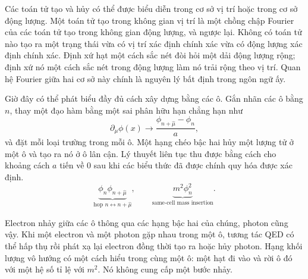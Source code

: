 Các toán tử tạo và hủy có thể được biểu diễn trong cơ sở vị trí hoặc trong cơ sở động lượng. Một toán tử tạo trong không gian vị trí là một chồng chập Fourier của các toán tử tạo trong không gian động lượng, và ngược lại. Không có toán tử nào tạo ra một trạng thái vừa có vị trí xác định chính xác vừa có động lượng xác định chính xác. Định xứ hạt một cách sắc nét đòi hỏi một dải động lượng rộng; định xứ nó một cách sắc nét trong động lượng làm nó trải rộng theo vị trí. Quan hệ Fourier giữa hai cơ sở này chính là nguyên lý bất định trong ngôn ngữ ấy.

\begin{classroomqa}
\end{classroomqa}

Giờ đây có thể phát biểu đầy đủ cách xây dựng bằng các ô. Gắn nhãn các ô bằng \(n\), thay một đạo hàm bằng một sai phân hữu hạn chẳng hạn như
\begin{equation}
\partial_\mu\phi(x)
\longrightarrow
\frac{\phi_{n+\hat\mu}-\phi_n}{a},
\end{equation}
và đặt mỗi loại trường trong mỗi ô. Một hạng chéo bậc hai hủy một lượng tử ở một ô và tạo ra nó ở ô lân cận. Lý thuyết liên tục thu được bằng cách cho khoảng cách \(a\) tiến về 0 sau khi các biểu thức đã được chính quy hóa được xác định.
\begin{equation}
\underbrace{\phi_n\phi_{n+\hat\mu}}_{\text{hop }n\leftrightarrow n+\hat\mu},
\qquad
\underbrace{m^2\phi_n^2}_{\text{same-cell mass insertion}}.
\end{equation}

\begin{classroomqa}
\end{classroomqa}

Electron nhảy giữa các ô thông qua các hạng bậc hai của chúng, photon cũng vậy. Khi một electron và một photon gặp nhau trong một ô, tương tác QED có thể hấp thụ rồi phát xạ lại electron đồng thời tạo ra hoặc hủy photon. Hạng khối lượng vô hướng có một cách hiểu trong cùng một ô: một hạt đi vào và rời ô đó với một hệ số tỉ lệ với \(m^2\). Nó không cung cấp một bước nhảy.

